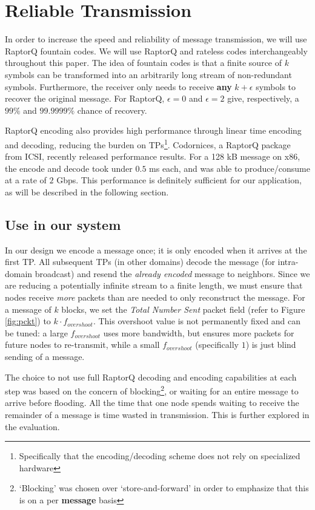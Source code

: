 \section{Reliable Transmission}\label{reliable}
In order to increase the speed and reliability of message transmission, we will use RaptorQ fountain codes. We will use RaptorQ and rateless codes interchangeably throughout this paper. The idea of fountain codes is that a finite source of $k$ symbols can be transformed into an arbitrarily long stream of non-redundant symbols. Furthermore, the receiver only needs to receive \textbf{any} $k + \epsilon$ symbols to recover the original message. For RaptorQ, $\epsilon = 0$ and $\epsilon = 2$ give, respectively, a $99\%$ and $99.9999\%$ chance of recovery.\cite{raptorq, raptorqpresent}

RaptorQ encoding also provides high performance through linear time encoding and decoding, reducing the burden on TPs\footnote{Specifically that the encoding/decoding scheme does not rely on specialized hardware}. Codornices, a RaptorQ package from ICSI, recently released performance results. For a 128 kB message on x86, the encode and decode took under $0.5$ ms each, and was able to produce/consume at a rate of $2$ Gbps\cite{raptorqperf}. This performance is definitely sufficient for our application, as will be described in the following section.

\subsection{Use in our system}
In our design we encode a message once; it is only encoded when it arrives at the first TP. All subsequent TPs (in other domains) decode the message (for intra-domain broadcast) and resend the \textit{already encoded} message to neighbors. Since we are reducing a potentially infinite stream to a finite length, we must ensure that nodes receive \textit{more} packets than are needed to only reconstruct the message. For a message of $k$ blocks, we set the \textit{Total Number Sent} packet field (refer to Figure \ref{fig:pckt}) to $k\cdot f_{overshoot}$. This overshoot value is not permanently fixed and can be tuned: a large $f_{overshoot}$ uses more bandwidth, but ensures more packets for future nodes to re-transmit, while a small $f_{overshoot}$ (specifically $1$) is just blind sending of a message.

The choice to not use full RaptorQ decoding and encoding capabilities at each step was based on the concern of blocking\footnote{`Blocking' was chosen over `store-and-forward' in order to emphasize that this is on a per \textbf{message} basis}, or waiting for an entire message to arrive before flooding. All the time that one node spends waiting to receive the remainder of a message is time wasted in transmission. This is further explored in the evaluation.

